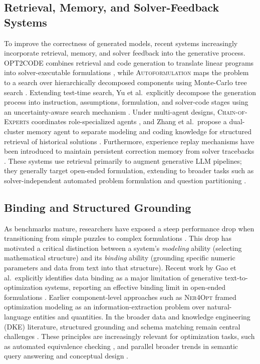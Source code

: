 \documentclass[3p]{elsarticle}
\begin{document}
\subsection{Retrieval, Memory, and Solver-Feedback Systems}
\label{subsec:rw_retrieval_memory}

To improve the correctness of generated models, recent systems increasingly incorporate retrieval, memory, and solver feedback into the generative process. \textsc{OPT2CODE} combines retrieval and code generation to translate linear programs into solver-executable formulations \cite{ahmed2025opt2code}, while \textsc{Autoformulation} maps the problem to a search over hierarchically decomposed components using Monte-Carlo tree search \cite{astorga2025autoformulation}. Extending test-time search, Yu et al.\ explicitly decompose the generation process into instruction, assumptions, formulation, and solver-code stages using an uncertainty-aware search mechanism \cite{yu2026uncertainty}. Under multi-agent designs, \textsc{Chain-of-Experts} coordinates role-specialized agents \cite{xiao2024chainofexperts}, and Zhang et al.\ propose a dual-cluster memory agent to separate modeling and coding knowledge for structured retrieval of historical solutions \cite{zhang2026dual}. Furthermore, experience replay mechanisms have been introduced to maintain persistent correction memory from solver tracebacks \cite{xie2026escaping}. These systems use retrieval primarily to augment generative LLM pipelines; they generally target open-ended formulation, extending to broader tasks such as solver-independent automated problem formulation \cite{li2026solver} and question partitioning \cite{pan2025pamop}.

\subsection{Binding and Structured Grounding}
\label{subsec:rw_binding}

As benchmarks mature, researchers have exposed a steep performance drop when transitioning from simple puzzles to complex formulations \cite{miplibnl2026}. This drop has motivated a critical distinction between a system's \emph{modeling} ability (selecting mathematical structure) and its \emph{binding} ability (grounding specific numeric parameters and data from text into that structure). Recent work by Gao et al.\ explicitly identifies data binding as a major limitation of generative text-to-optimization systems, reporting an effective binding limit in open-ended formulations \cite{gao2026models}. Earlier component-level approaches such as \textsc{Ner4Opt} \cite{kadioglu2024ner4opt} framed optimization modeling as an information-extraction problem over natural-language entities and quantities. In the broader data and knowledge engineering (DKE) literature, structured grounding and schema matching remain central challenges \cite{yu2018spider,affolter2019nli,sheetrit2024rematch}. These principles are increasingly relevant for optimization tasks, such as automated equivalence checking \cite{zhai2025equivamap}, and parallel broader trends in semantic query answering and conceptual design \cite{rizzi2025conceptual,atzeni2026semantic}.
\end{document}
